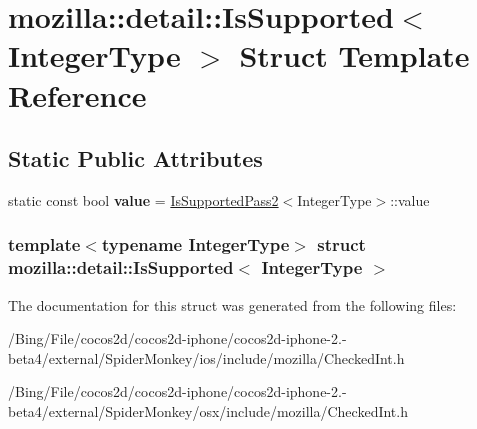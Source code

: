 \hypertarget{structmozilla_1_1detail_1_1_is_supported}{\section{mozilla\-:\-:detail\-:\-:Is\-Supported$<$ Integer\-Type $>$ Struct Template Reference}
\label{structmozilla_1_1detail_1_1_is_supported}
}
\subsection*{Static Public Attributes}
\begin{DoxyCompactItemize}
\item 
\hypertarget{structmozilla_1_1detail_1_1_is_supported_acd566abc5660873d04f6e732e8f11ea3}{static const bool {\bfseries value} = \hyperlink{structmozilla_1_1detail_1_1_is_supported_pass2}{Is\-Supported\-Pass2}$<$Integer\-Type$>$\-::value}\label{structmozilla_1_1detail_1_1_is_supported_acd566abc5660873d04f6e732e8f11ea3}

\end{DoxyCompactItemize}
\subsubsection*{template$<$typename Integer\-Type$>$ struct mozilla\-::detail\-::\-Is\-Supported$<$ Integer\-Type $>$}



The documentation for this struct was generated from the following files\-:\begin{DoxyCompactItemize}
\item 
/\-Bing/\-File/cocos2d/cocos2d-\/iphone/cocos2d-\/iphone-\/2.-\/beta4/external/\-Spider\-Monkey/ios/include/mozilla/Checked\-Int.\-h\item 
/\-Bing/\-File/cocos2d/cocos2d-\/iphone/cocos2d-\/iphone-\/2.-\/beta4/external/\-Spider\-Monkey/osx/include/mozilla/Checked\-Int.\-h\end{DoxyCompactItemize}
